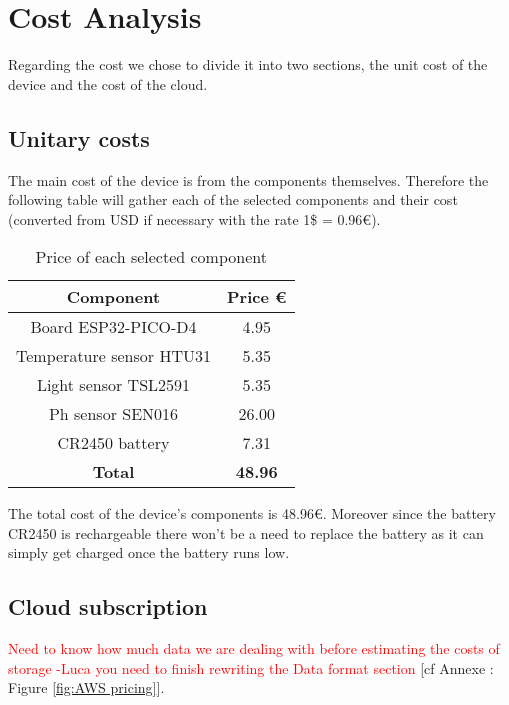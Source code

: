 \section{Cost Analysis}
Regarding the cost we chose to divide it into two sections, the unit cost of the device and the cost of the cloud.

\subsection{Unitary costs}
The main cost of the device is from the components themselves. Therefore the following table will gather each of the selected components and their cost (converted from USD if necessary with the rate 1\$ = 0.96€).\\

\begin{table}[htbp]
    \centering
    \begin{tabular}{|c|c|}
        \hline
        \textbf{Component} & \textbf{Price €} \\
        \hline
         Board ESP32-PICO-D4 & 4.95 \\
         Temperature sensor HTU31 & 5.35 \\
         Light sensor TSL2591 & 5.35 \\
         Ph sensor SEN016 & 26.00 \\
         CR2450 battery & 7.31 \\
         \hline
         \textbf{Total} & \textbf{48.96}\\
         \hline
    \end{tabular}
    \caption{Price of each selected component}
    \label{tab:my_label}
\end{table}

The total cost of the device's components is 48.96€. Moreover since the battery CR2450 is rechargeable there won't be a need to replace the battery as it can simply get charged once the battery runs low.

\subsection{Cloud subscription}
\textcolor{red}{Need to know how much data we are dealing with before estimating the costs of storage -Luca you need to finish rewriting the Data format section}  [cf Annexe : Figure \ref{fig:AWS pricing}].